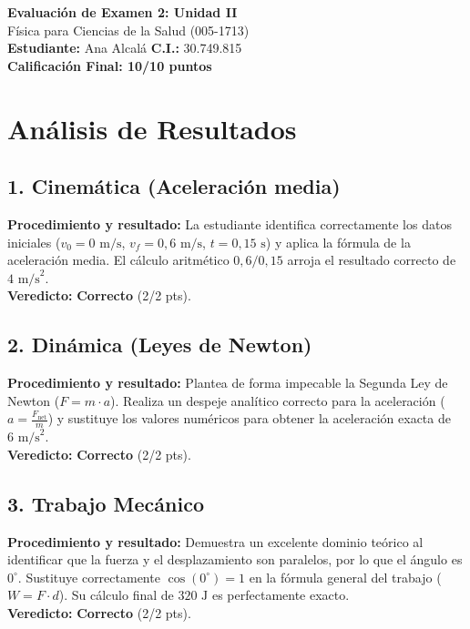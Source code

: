 \documentclass[12pt,letterpaper]{article}
\begin{document}
\begin{center}
    \Large \textbf{Evaluación de Examen 2: Unidad II} \\
    \large Física para Ciencias de la Salud (005-1713) \\
    \vspace{0.5cm}
    \textbf{Estudiante:} Ana Alcalá \quad \textbf{C.I.:} 30.749.815
    \vspace{0.3cm} \\
    \large \textbf{Calificación Final: 10/10 puntos}
\end{center}

\vspace{0.5cm}

\section*{Análisis de Resultados}

\subsection*{1. Cinemática (Aceleración media)}
\textbf{Procedimiento y resultado:} La estudiante identifica correctamente los datos iniciales ($v_0 = 0 \text{ m/s}$, $v_f = 0,6 \text{ m/s}$, $t = 0,15 \text{ s}$) y aplica la fórmula de la aceleración media. El cálculo aritmético $0,6 / 0,15$ arroja el resultado correcto de $4 \text{ m/s}^2$. \\
\textbf{Veredicto:} \textbf{Correcto} (2/2 pts).

\subsection*{2. Dinámica (Leyes de Newton)}
\textbf{Procedimiento y resultado:} Plantea de forma impecable la Segunda Ley de Newton ($F = m \cdot a$). Realiza un despeje analítico correcto para la aceleración ($a = \frac{F_{\text{net}}}{m}$) y sustituye los valores numéricos para obtener la aceleración exacta de $6 \text{ m/s}^2$. \\
\textbf{Veredicto:} \textbf{Correcto} (2/2 pts).

\subsection*{3. Trabajo Mecánico}
\textbf{Procedimiento y resultado:} Demuestra un excelente dominio teórico al identificar que la fuerza y el desplazamiento son paralelos, por lo que el ángulo es $0^\circ$. Sustituye correctamente $\cos(0^\circ) = 1$ en la fórmula general del trabajo ($W = F \cdot d$). Su cálculo final de $320 \text{ J}$ es perfectamente exacto. \\
\textbf{Veredicto:} \textbf{Correcto} (2/2 pts).
\end{document}
